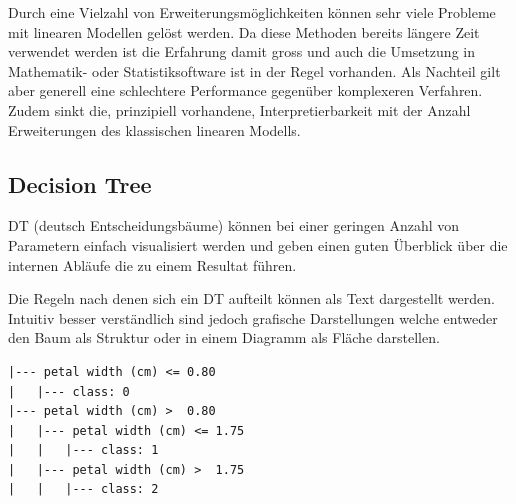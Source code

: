 \documentclass[
  12pt, %
  a4paper, %
  oneside, %
  openany, 
  numbers=noenddot, %
  BCOR=5mm, %
  parskip=half*, %
  thesis, %
]{bfhbook}
\begin{document}
Durch eine Vielzahl von Erweiterungsmöglichkeiten können sehr viele Probleme mit linearen Modellen gelöst werden. Da diese Methoden bereits längere Zeit verwendet werden ist die Erfahrung damit gross und auch die Umsetzung in Mathematik- oder Statistiksoftware ist in der Regel vorhanden. Als Nachteil gilt aber generell eine schlechtere Performance gegenüber komplexeren Verfahren. Zudem sinkt die, prinzipiell vorhandene, Interpretierbarkeit mit der Anzahl Erweiterungen des klassischen linearen Modells.

\subsection{Decision Tree}
\label{DT}
\Gls{DT} (deutsch Entscheidungsbäume) können bei einer geringen Anzahl von Parametern einfach visualisiert werden und geben einen guten Überblick über die internen Abläufe die zu einem Resultat führen.

\begin{minipage}[t]{0.45\linewidth}
\vspace{10pt}
Die Regeln nach denen sich ein \Gls{DT} aufteilt können als Text dargestellt werden. Intuitiv besser verständlich sind jedoch grafische Darstellungen welche entweder den Baum als Struktur oder in einem Diagramm als Fläche darstellen.
\end{minipage}\hfill
\begin{minipage}[t]{0.45\linewidth}
\begin{lstlisting}
|--- petal width (cm) <= 0.80
|   |--- class: 0
|--- petal width (cm) >  0.80
|   |--- petal width (cm) <= 1.75
|   |   |--- class: 1
|   |--- petal width (cm) >  1.75
|   |   |--- class: 2
\end{lstlisting}
\end{minipage}
\end{document}
